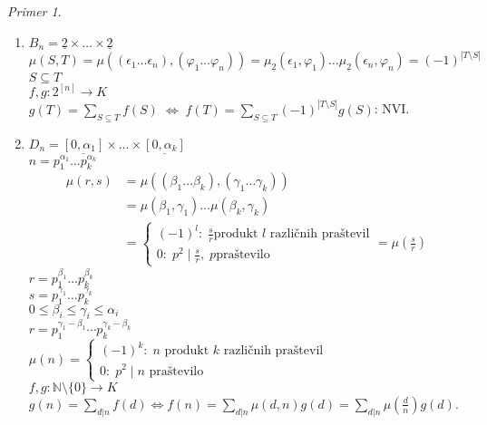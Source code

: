 \documentclass[a4paper, 12pt]{book}
\theoremstyle{definition}
\theoremstyle{remark}
\newtheorem*{ex}{Primer}
\newcommand{\N}{\mathbb{N}}
\begin{document}
\begin{ex} \text{}
  \begin{enumerate}[label=(\arabic*)]
    \item $B_n = \underline{2} \times \dots \times \underline{2}$ \\
      $\mu(S, T) = \mu((\epsilon_1 \dots \epsilon_n), (\varphi_1 \dots \varphi_n))
        = \mu_{\underline{2}}(\epsilon_1, \varphi_1) \dots \mu_{\underline{2}}(\epsilon_n, \varphi_n)
        = (-1)^{|T \setminus S|}$ \\
      $S \subseteq T$ \\
      $f, g: 2^{[n]} \to K$ \\
      $g(T) = \sum_{S \subseteq T} f(S) \; \iff \;
      f(T) = \sum_{S \subseteq T} (-1)^{|T \setminus S|} g(S)$: NVI.
    \item $D_n = \underline{[0, \alpha_1]} \times \dots \times \underline{[0, \alpha_k]}$ \\
      $n = p_1^{\alpha_1} \dots p_k^{\alpha_k}$
      \begin{align*}
        \mu(r,s) &= \mu((\beta_1 \dots \beta_k), (\gamma_1 \dots \gamma_k)) \\
        &= \mu(\beta_1, \gamma_1) \dots \mu(\beta_k, \gamma_k) \\
        &= \begin{cases}
          (-1)^l: \; \frac{s}{r} \text{produkt $l$ različnih praštevil} \\
          0: \; p^2 \mid \frac{s}{r}, \; p \text{praštevilo}
        \end{cases} = \mu\left(\frac{s}{r}\right)
      \end{align*}
      $r = p_1^{\beta_1} \dots p_k^{\beta_k}$ \\
      $s = p_1^{\gamma_1} \dots p_k^{\gamma_k}$ \\
      $0 \leq \beta_i \leq \gamma_i \leq \alpha_i$ \\
      $r = p_1^{\gamma_1 - \beta_1} \cdots p_k^{\gamma_k - \beta_k}$ \\
      $\mu(n) = \begin{cases}
        (-1)^k: \; n \text{ produkt $k$ različnih praštevil} \\
        0: \; p^2 \mid n \text{ praštevilo}
      \end{cases}$ \\
      $f, g: \N \setminus \{0\} \to K$ \\
      $g(n) = \sum_{d | n} f(d) \iff
      f(n) = \sum_{d | n} \mu(d,n) g(d) = \sum_{d | n} \mu\left(\frac{d}{n}\right) g(d)$.
  \end{enumerate}
\end{ex}
\end{document}
